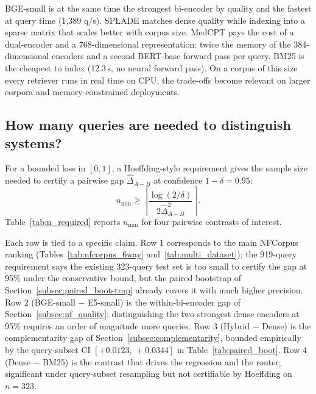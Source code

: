 \documentclass[11pt,a4paper]{article}
\begin{document}
\begin{table}[ht]
    \centering
    \caption{Efficiency metrics on NFCorpus (3{,}633 documents,
    single-threaded, top-100 retrieval). Index build includes corpus
    encoding for dense methods. Throughput is measured on the 323-query
    test set. Memory refers to the in-memory index size: inverted list
    for BM25, scipy.sparse CSR for SPLADE, and float32 matrix for dense
    encoders. Dense encoder build times use a Colab T4 GPU; CPU-only
    builds would be roughly $10\times$ slower.}
    \label{tab:efficiency}
    \small
    
\end{table}

BGE-small is at the same time the strongest bi-encoder by quality and
the fastest at query time (1{,}389 q/s). SPLADE matches dense quality
while indexing into a sparse matrix that scales better with corpus
size. MedCPT pays the cost of a dual-encoder and a 768-dimensional
representation: twice the memory of the 384-dimensional encoders and a
second BERT-base forward pass per query. BM25 is the cheapest to
index (12.3\,s, no neural forward pass). On a corpus of this size
every retriever runs in real time on CPU; the trade-offs become
relevant on larger corpora and memory-constrained deployments.

\subsection{How many queries are needed to distinguish systems?}
\label{subsec:n_required}

For a bounded loss in $[0,1]$, a Hoeffding-style requirement gives the
sample size needed to certify a pairwise gap $\hat{\Delta}_{A-B}$ at
confidence $1-\delta = 0.95$:
\[
n_{\min} \ge \left\lceil \frac{\log(2/\delta)}{2\hat{\Delta}_{A-B}^2} \right\rceil.
\]
Table~\ref{tab:n_required} reports $n_{\min}$ for four pairwise
contrasts of interest.

\begin{table}[ht]
    \centering
    \caption{Pairwise sample-size requirements (Hoeffding-style,
    $\delta=0.05$) using observed NFCorpus nDCG@10 gaps.}
    \label{tab:n_required}
    \small
    
\end{table}

Each row is tied to a specific claim. Row 1 corresponds to the main
NFCorpus ranking (Tables~\ref{tab:nfcorpus_6way}
and~\ref{tab:multi_dataset}); the 919-query requirement says the
existing 323-query test set is too small to certify the gap at 95\%
under the conservative bound, but the paired bootstrap of
Section~\ref{subsec:paired_bootstrap} already covers it with much
higher precision. Row 2 (BGE-small $-$ E5-small) is the within-bi-encoder
gap of Section~\ref{subsec:nf_quality}; distinguishing the two
strongest dense encoders at 95\% requires an order of magnitude more
queries. Row 3 (Hybrid $-$ Dense) is the complementarity gap of
Section~\ref{subsec:complementarity}, bounded empirically by the
query-subset CI $[+0.0123,\,+0.0344]$ in Table~\ref{tab:paired_boot}.
Row 4 (Dense $-$ BM25) is the contrast that drives the regression and
the router; significant under query-subset resampling but not
certifiable by Hoeffding on $n=323$.
\end{document}
